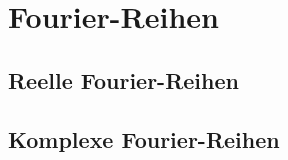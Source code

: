 %
%
%
\section{Fourier-Reihen
\label{section:fourier-reihen}}

\subsection{Reelle Fourier-Reihen}

\subsection{Komplexe Fourier-Reihen}


